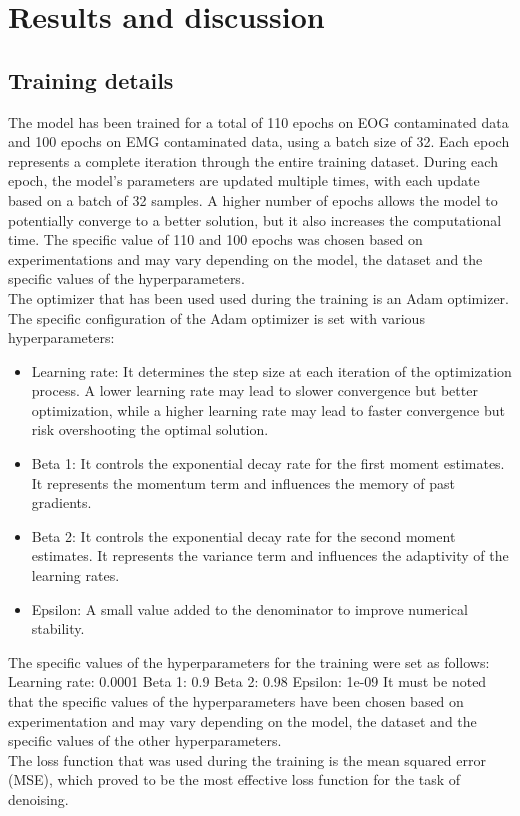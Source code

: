 \documentclass[a4paper, noexaminfo]{sapthesis}
\begin{document}
\section{Results and discussion}
\subsection{Training details}
The model has been trained for a total of 110 epochs on EOG contaminated 
data and
100 epochs on EMG contaminated data, using a batch size of 32. Each 
epoch represents a complete iteration through the entire training 
dataset. During each epoch, the model's parameters are updated 
multiple times, with each update based on a batch of 32 samples.\newline
A higher number of epochs allows the model to potentially converge 
to a better solution, but it also increases the computational time. 
The specific value of 110 and 100 epochs was chosen based on experimentations
 and may vary depending on the model, the dataset and the specific
 values of the hyperparameters.\newline \\
The optimizer that has been used used during the training is an Adam optimizer.
The specific configuration of the Adam optimizer is set with various 
hyperparameters:
\begin{itemize}
\item Learning rate: It determines the step size at each 
 iteration of the optimization process. A lower learning rate may 
lead to slower convergence but better optimization, while a higher 
learning rate may lead to faster convergence but risk overshooting 
the optimal solution.
\item Beta 1: It controls the exponential decay rate for the 
first moment estimates. It represents the momentum term and 
influences the memory of past gradients.
\item Beta 2: It controls the exponential decay rate for 
the second moment estimates. It represents the variance term 
and influences the adaptivity of the learning rates.
\item Epsilon: A small value added to the denominator to 
improve numerical stability.
\end{itemize}
The specific values of the hyperparameters for the training were 
set as follows:
Learning rate: 0.0001
Beta 1: 0.9
Beta 2: 0.98
Epsilon: 1e-09
It must be noted that the specific values of the hyperparameters
have been chosen based on experimentation and may vary depending
on the model, the dataset and the specific values of the other
hyperparameters.\newline \\
The loss function that was used during the training is the mean
squared error (MSE), which proved to be the most effective loss
function for the task of denoising. 
\end{document}
